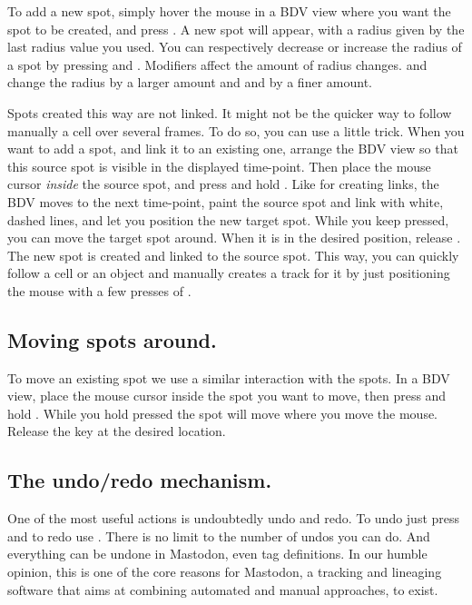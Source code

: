 To add a new spot, simply hover the mouse in a BDV view where you want the spot to be created, and press .
A new spot will appear, with a radius given by the last radius value you used.
You can respectively decrease or increase the radius of a spot by pressing  and .
Modifiers affect the amount of radius changes.
 and  change the radius by a larger amount and  and  by a finer amount.

Spots created this way are not linked. 
It might not be the quicker way to follow manually a cell over several frames. 
To do so, you can use a little trick. 
When you want to add a spot, and link it to an existing one, arrange the BDV view so that this source spot is visible in the displayed time-point.
Then place the mouse cursor \textit{inside} the source spot, and press and hold .
Like for creating links, the BDV moves to the next time-point, paint the source spot and link with white, dashed lines, and let you position the new target spot.
While you keep  pressed, you can move the target spot around.
When it is in the desired position, release .
The new spot is created and linked to the source spot.
This way, you can quickly follow a cell or an object and manually creates a track for it by just positioning the mouse with a few presses of .

\subsection{Moving spots around.}

To move an existing spot we use a similar interaction with the spots.
In a BDV view, place the mouse cursor inside the spot you want to move, then press and hold .
While you hold  pressed the spot will move where you move the mouse. 
Release the  key at the desired location.


\subsection{The undo/redo mechanism.}

One of the most useful actions is undoubtedly undo and redo. 
To undo just press  and to redo use . 
There is no limit to the number of undos you can do. 
And everything can be undone in Mastodon, even tag definitions.
In our humble opinion, this is one of the core reasons for Mastodon, a tracking and lineaging software that aims at combining automated and manual approaches, to exist.


